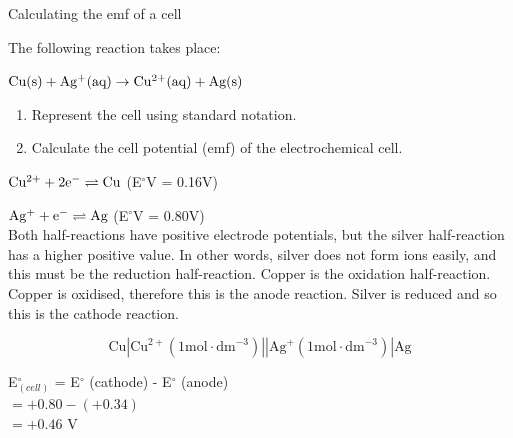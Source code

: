 \begin{wex}{Calculating the emf of a cell}{The following reaction takes place:

\begin{center}
$\rm{Cu(s) + Ag^{+}(aq) \rightarrow Cu^{2+}(aq) + Ag(s)}$
\end{center}

\begin{enumerate}
\item{Represent the cell using standard notation.}
\item{Calculate the cell potential (emf) of the electrochemical cell.\\}
\end{enumerate}
}
{
$\rm{Cu^{2+} + 2e^{-} \rightleftharpoons Cu}$ (E$^{\circ}$V = 0.16V)

$\rm{Ag^{+} + e^{-} \rightleftharpoons Ag}$ (E$^{\circ}$V = 0.80V)\\

Both half-reactions have positive electrode potentials, but the silver half-reaction has a higher positive value. In other words, silver does not form ions easily, and this must be the reduction half-reaction. Copper is the oxidation half-reaction. Copper is oxidised, therefore this is the anode reaction. Silver is reduced and so this is the cathode reaction.

\begin{equation*}
\text{Cu}|\text{Cu}^{2+} (1 \text{mol} \cdot \text{dm}^{-3})||\text{Ag}^{+} (1 \text{mol} \cdot \text{dm}^{-3})|\text{Ag}
\end{equation*}

E$^{\circ}_{(cell)}$ = E$^{\circ}$ (cathode) - E$^{\circ}$ (anode)\\

$= +0.80 - (+0.34)$\\

$= +0.46$ V
}
\end{wex}

